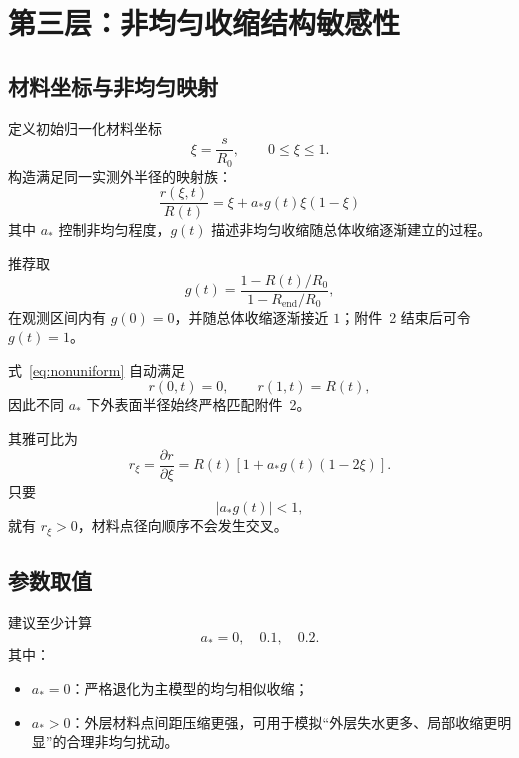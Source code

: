 \documentclass[UTF8,a4paper,12pt]{ctexart}
\begin{document}
\section{第三层：非均匀收缩结构敏感性}

\subsection{材料坐标与非均匀映射}

定义初始归一化材料坐标
\begin{equation}
\xi=\frac{s}{R_0},
\qquad 0\le\xi\le1.
\label{eq:xi}
\end{equation}
构造满足同一实测外半径的映射族：
\begin{equation}
\boxed{
\frac{r(\xi,t)}{R(t)}
=
\xi+a_*g(t)\xi(1-\xi)
}
\label{eq:nonuniform}
\end{equation}
其中 $a_*$ 控制非均匀程度，$g(t)$ 描述非均匀收缩随总体收缩逐渐建立的过程。

推荐取
\begin{equation}
g(t)
=
\frac{1-R(t)/R_0}
{1-R_{\mathrm{end}}/R_0},
\label{eq:g}
\end{equation}
在观测区间内有 $g(0)=0$，并随总体收缩逐渐接近 $1$；附件~2 结束后可令 $g(t)=1$。

式~\eqref{eq:nonuniform} 自动满足
\begin{equation}
r(0,t)=0,
\qquad
r(1,t)=R(t),
\label{eq:endpoints}
\end{equation}
因此不同 $a_*$ 下外表面半径始终严格匹配附件~2。

其雅可比为
\begin{equation}
r_\xi
=
\frac{\partial r}{\partial\xi}
=
R(t)
\left[
1+a_*g(t)(1-2\xi)
\right].
\label{eq:jacobian}
\end{equation}
只要
\[
|a_*g(t)|<1,
\]
就有 $r_\xi>0$，材料点径向顺序不会发生交叉。

\subsection{参数取值}

建议至少计算
\begin{equation}
\boxed{a_*=0,\quad0.1,\quad0.2.}
\label{eq:avalues}
\end{equation}
其中：
\begin{itemize}
    \item $a_*=0$：严格退化为主模型的均匀相似收缩；
    \item $a_*>0$：外层材料点间距压缩更强，可用于模拟“外层失水更多、局部收缩更明显”的合理非均匀扰动。
\end{itemize}
\end{document}
